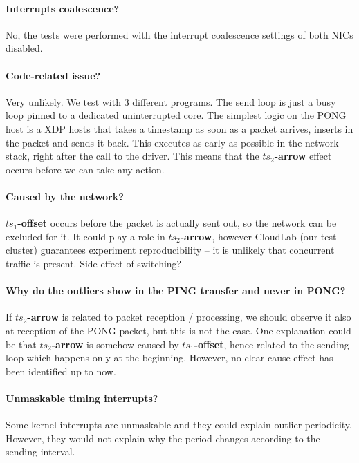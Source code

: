 \documentclass{article}
\begin{document}
\paragraph*{Interrupts coalescence?}
No, the tests were performed with the interrupt coalescence settings of both
NICs disabled. 

\paragraph*{Code-related issue?}
Very unlikely. We test with 3 different programs. The send loop is just a busy 
loop pinned to a dedicated uninterrupted core. The simplest logic on the PONG
host is a XDP hosts that takes a timestamp as soon as a packet arrives,
inserts in the packet and sends it back. This executes as early as possible in
the network stack, right after the call to the driver. This means that 
the \textbf{$ts_2$-arrow} effect occurs before we can take any action.

\paragraph*{Caused by the network?}
\textbf{$ts_1$-offset} occurs before the packet is actually sent out, so 
the network can be excluded for it. It could play a role in 
\textbf{$ts_2$-arrow}, however CloudLab (our test cluster) guarantees
experiment reproducibility -- it is unlikely that concurrent traffic is 
present. Side effect of switching?

\paragraph*{Why do the outliers show in the PING transfer and never in PONG?}
If \textbf{$ts_2$-arrow} is related to packet reception / processing, we 
should observe it also at reception of the PONG packet, but this is not the case.
One explanation could be that \textbf{$ts_2$-arrow} is somehow caused by
\textbf{$ts_1$-offset}, hence related to the sending loop which happens only
at the beginning. However, no clear cause-effect has been identified up to now.  

\paragraph*{Unmaskable timing interrupts?}
Some kernel interrupts are unmaskable and they could explain outlier 
periodicity. However, they would not explain why the period changes according
to the sending interval.
\end{document}
